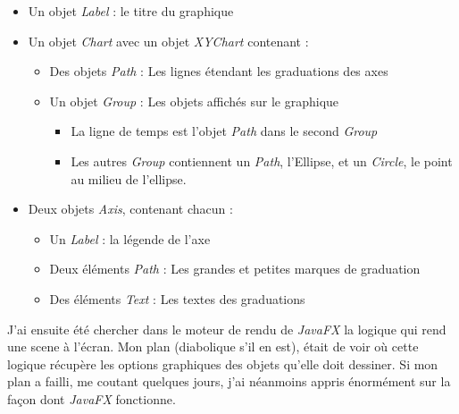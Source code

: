 \begin{itemize}
\item Un objet \textit{Label} : le titre du graphique
\item Un objet \textit{Chart} avec un objet \textit{XYChart} contenant :
  \begin{itemize}
  \item Des objets \textit{Path} : Les lignes étendant les graduations des axes
  \item Un objet \textit{Group} : Les objets affichés sur le graphique
    \begin{itemize}
    \item La ligne de temps est l'objet \textit{Path} dans le second \textit{Group}
    \item Les autres \textit{Group} contiennent un \textit{Path}, l'Ellipse, et un \textit{Circle}, le point au milieu de l'ellipse.
    \end{itemize}
  \end{itemize}
\item Deux objets \textit{Axis}, contenant chacun :
  \begin{itemize}
  \item Un \textit{Label} : la légende de l'axe
  \item Deux éléments \textit{Path} : Les grandes et petites marques de graduation
  \item Des éléments \textit{Text} : Les textes des graduations
  \end{itemize}
\end{itemize}

J'ai ensuite été chercher dans le moteur de rendu de \textit{JavaFX} la logique qui rend une scene à l'écran. Mon plan (diabolique s'il en est), était de voir où cette logique récupère les options graphiques des objets qu'elle doit dessiner. Si mon plan a failli, me coutant quelques jours, j'ai néanmoins appris énormément sur la façon dont \textit{JavaFX} fonctionne. 


